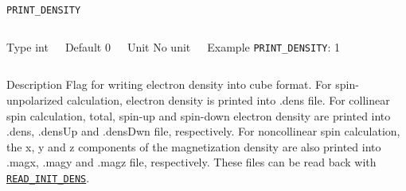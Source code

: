 \begin{frame}[allowframebreaks]{\texttt{PRINT\_DENSITY}} \label{PRINT_DENSITY}
\vspace*{-12pt}
\begin{columns}
\begin{block}{Type}
int
\end{block}

\begin{block}{Default}
0
\end{block}

\begin{block}{Unit}
No unit
\end{block}

\begin{block}{Example}
\texttt{PRINT\_DENSITY}: 1
\end{block}
\end{columns}

\begin{block}{Description}
Flag for writing electron density into cube format. For spin-unpolarized calculation, electron density is printed into .dens file. For collinear spin calculation, total, spin-up and spin-down electron density are printed into .dens, .densUp and .densDwn file, respectively. For noncollinear spin calculation, the x, y and z components of the magnetization density are also printed into .magx, .magy and .magz file, respectively. These files can be read back with \hyperlink{READ_INIT_DENS}{\texttt{READ\_INIT\_DENS}}.
\end{block}

\end{frame}



